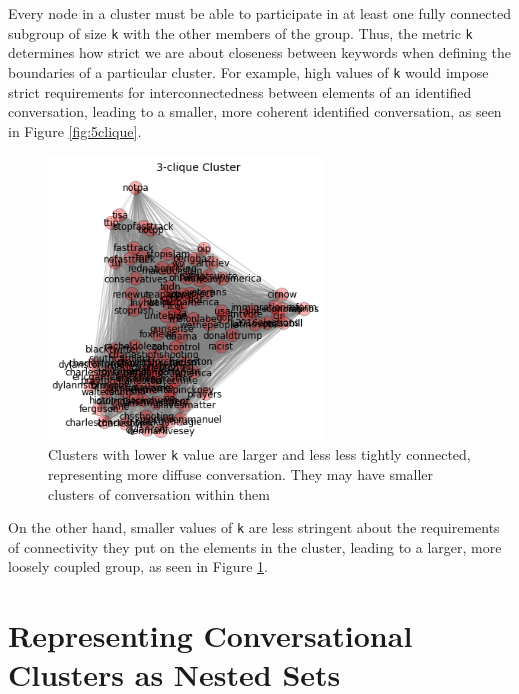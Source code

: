\documentclass[12pt]{article}
\begin{document}
Every node in a cluster must be able to participate in at least one fully connected subgroup of size \texttt{k} with the other members of the group. Thus, the metric \texttt{k} determines how strict we are about closeness between keywords when defining the boundaries of a particular cluster. 
For example, high values of \texttt{k} would impose strict requirements for interconnectedness between elements of an identified conversation, leading to a smaller, more coherent identified conversation, as seen in Figure \ref{fig:5clique}.

\begin{figure}[!ht]
  \centering
    \includegraphics[width=0.65\textwidth]{F4_3clique_clusters.png}
    \caption{Clusters  with  lower  \texttt{k}  value  are  larger  and  less  less  tightly  connected,  representing  more  diffuse  conversation.  They  may  have  smaller  clusters  of  conversation within them}
  \label{fig:3clique}
\end{figure}

On the other hand, smaller values of \texttt{k} are less stringent about the requirements of connectivity they put on the elements in the cluster, leading to a larger, more loosely coupled group, as seen in Figure \ref{fig:3clique}.

\section{Representing Conversational Clusters as Nested Sets}
\end{document}
